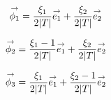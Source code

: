       \begin{minipage}{\textwidth}
        \begin{minipage}{0.329\textwidth}
            \begin{center}
              \begin{tikzpicture}[scale=1]
                
              \end{tikzpicture}
            \end{center}
            \begin{equation*}
              \vect{\phi_1}=\frac{\xi_1}{2|T|}\vect{e_1} + \frac{\xi_2}{{2|T|}}\vect{e_2}
            \end{equation*}
        \end{minipage}
        \begin{minipage}{0.329\textwidth}
            \begin{center}
              \begin{tikzpicture}[scale=1]
                
              \end{tikzpicture}
               \begin{equation*}
                \vect{\phi_2}=\frac{\xi_1-1}{2|T|}\vect{e_1} + \frac{\xi_2}{2|T|}\vect{e_2}
              \end{equation*}
            \end{center}
        \end{minipage}
        \begin{minipage}{0.329\textwidth}
            \begin{center}
              \begin{tikzpicture}[scale=1]
                
              \end{tikzpicture}
              \begin{equation*}
                \vect{\phi_3}=\frac{\xi_1}{2|T|}\vect{e_1} + \frac{\xi_2-1}{2|T|}\vect{e_2}
              \end{equation*}
            \end{center}
        \end{minipage}
        \label{fig:form_int:fon_base:phi}
      \end{minipage}


